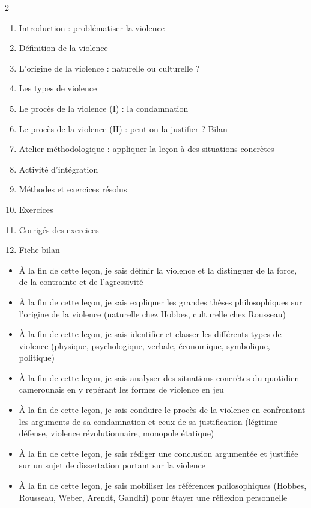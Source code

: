 \documentclass[11pt]{article}
\begin{document}
\begin{sommaire}
\begin{multicols}{2}
\begin{enumerate}
\item Introduction : problématiser la violence
\item Définition de la violence
\item L'origine de la violence : naturelle ou culturelle ?
\item Les types de violence
\item Le procès de la violence (I) : la condamnation
\item Le procès de la violence (II) : peut-on la justifier ? Bilan
\item Atelier méthodologique : appliquer la leçon à des situations concrètes
\item Activité d'intégration
\item Méthodes et exercices résolus
\item Exercices
\item Corrigés des exercices
\item Fiche bilan
\end{enumerate}
\end{multicols}
\end{sommaire}

\begin{objectifs}
\begin{itemize}
\item À la fin de cette leçon, je sais définir la violence et la distinguer de la force, de la contrainte et de l'agressivité
\item À la fin de cette leçon, je sais expliquer les grandes thèses philosophiques sur l'origine de la violence (naturelle chez Hobbes, culturelle chez Rousseau)
\item À la fin de cette leçon, je sais identifier et classer les différents types de violence (physique, psychologique, verbale, économique, symbolique, politique)
\item À la fin de cette leçon, je sais analyser des situations concrètes du quotidien camerounais en y repérant les formes de violence en jeu
\item À la fin de cette leçon, je sais conduire le procès de la violence en confrontant les arguments de sa condamnation et ceux de sa justification (légitime défense, violence révolutionnaire, monopole étatique)
\item À la fin de cette leçon, je sais rédiger une conclusion argumentée et justifiée sur un sujet de dissertation portant sur la violence
\item À la fin de cette leçon, je sais mobiliser les références philosophiques (Hobbes, Rousseau, Weber, Arendt, Gandhi) pour étayer une réflexion personnelle
\end{itemize}
\end{objectifs}
\end{document}
